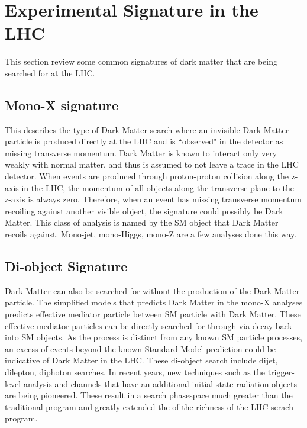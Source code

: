 
\section{Experimental Signature in the LHC}
\label{section:signatures}
This section review some common signatures of dark matter that are being searched for at the LHC.

\subsection{Mono-X signature}
\label{sec:monoX}
    This describes the type of Dark Matter search where an invisible Dark Matter particle is produced directly at the LHC and is ``observed" in the detector as missing transverse momentum.
    Dark Matter is known to interact only very weakly with normal matter, and thus is assumed to not leave a trace in the LHC detector. When events are produced through proton-proton collision along the z-axis in the LHC, the momentum of all objects along the transverse plane to the z-axis is always zero. Therefore, when an event has missing transverse momentum recoiling against another visible object, the signature could possibly be Dark Matter.
This class of analysis is named by the SM object that Dark Matter recoils against. Mono-jet, mono-Higgs, mono-Z are a few analyses done this way. 

\subsection{Di-object Signature}
    Dark Matter can also be searched for without the production of the Dark Matter particle. The simplified models that predicts Dark Matter in the mono-X analyses predicts effective mediator particle between SM particle with Dark Matter. These effective mediator particles can be directly searched for through via decay back into SM objects. As the process is distinct from any known SM particle processes, an excess of events beyond the known Standard Model prediction could be indicative of Dark Matter in the LHC. These di-object search include dijet, dilepton, diphoton searches. In recent years, new techniques such as the trigger-level-analysis and channels that have an additional initial state radiation objects are being pioneered. These result in a search phasespace much greater than the traditional program and greatly extended the of the richness of the LHC serach program.

